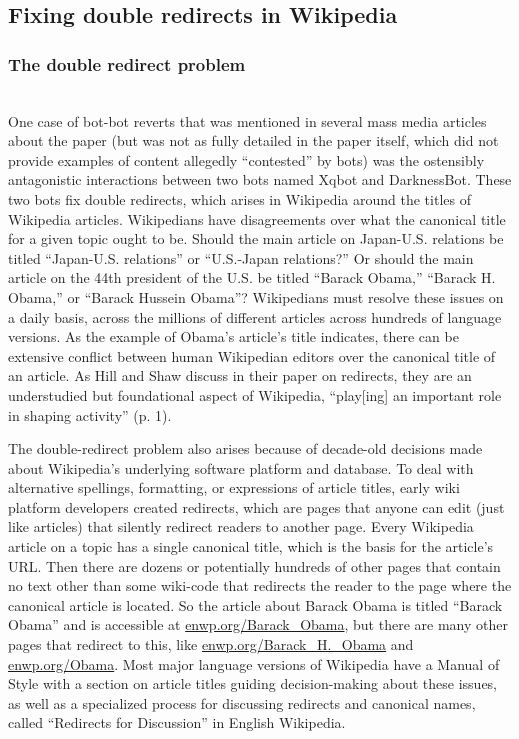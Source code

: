 \documentclass[format=acmsmall, review=false, screen=true]{acmart}%
\begin{document}
\subsection{Fixing double redirects in Wikipedia} \label{s:qualdesc:double}
  
\subsubsection{The double redirect problem}
~\\
One case of bot-bot reverts that was mentioned in several mass media articles about the paper (but was not as fully detailed in the paper itself, which did not provide examples of content allegedly ``contested'' by bots) was the ostensibly antagonistic interactions between two bots named Xqbot and DarknessBot. These two bots fix double redirects, which arises in Wikipedia around the titles of Wikipedia articles. Wikipedians have disagreements over what the canonical title for a given topic ought to be. Should the main article on Japan-U.S. relations be titled ``Japan-U.S. relations'' or ``U.S.-Japan relations?'' Or should the main article on the 44th president of the U.S. be titled ``Barack Obama,'' ``Barack H. Obama,'' or ``Barack Hussein Obama''? Wikipedians must resolve these issues on a daily basis, across the millions of different articles across hundreds of language versions. As the example of Obama's article's title indicates, there can be extensive conflict between human Wikipedian editors over the canonical title of an article. As Hill and Shaw \cite{Hill2014} discuss in their paper on redirects, they are an understudied but foundational aspect of Wikipedia, ``play[ing] an important role in shaping activity'' (p. 1).  

The double-redirect problem also arises because of decade-old decisions made about Wikipedia's underlying software platform and database. To deal with alternative spellings, formatting, or expressions of article titles, early wiki platform developers created redirects, which are pages that anyone can edit (just like articles) that silently redirect readers to another page. Every Wikipedia article on a topic has a single canonical title, which is the basis for the article's URL. Then there are dozens or potentially hundreds of other pages that contain no text other than some wiki-code that redirects the reader to the page where the canonical article is located. So the article about Barack Obama is titled ``Barack Obama'' and is accessible at \url{enwp.org/Barack\_Obama}, but there are many other pages that redirect to this, like \url{enwp.org/Barack\_H.\_Obama} and \url{enwp.org/Obama}. Most major language versions of Wikipedia have a Manual of Style with a section on article titles guiding decision-making about these issues, as well as a specialized process for discussing redirects and canonical names, called ``Redirects for Discussion'' in English Wikipedia.   
\end{document}
